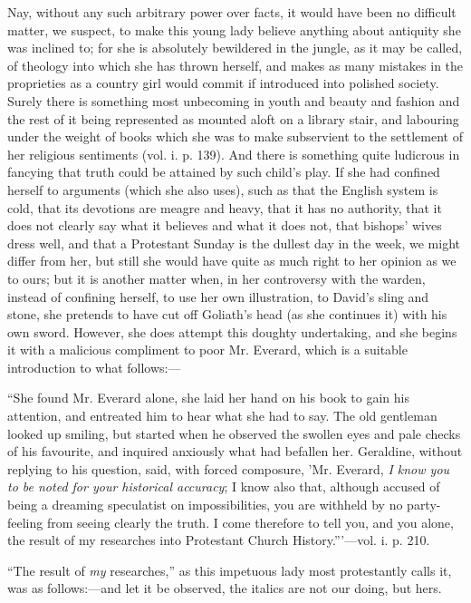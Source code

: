Nay, without any such arbitrary power over facts,
it would have been no difficult matter, we suspect, to make this young
lady believe anything about antiquity she was inclined to; for she is
absolutely bewildered in the jungle, as it may be called, of theology
into which she has thrown herself, and makes as many mistakes in the
proprieties as a country girl would commit if introduced into polished
society. Surely there is something most unbecoming in youth and beauty
and fashion and the rest of it being represented as mounted aloft on a
library stair, and labouring under the weight of books which she was to
make subservient to the settlement of her religious sentiments (vol. i.
p. 139). And there is something quite ludicrous in fancying that truth
could be attained by such child's play. If she had confined herself to
arguments (which she also uses), such as that the English system is
cold, that its devotions are meagre and heavy, that it has no authority,
that it does not clearly say what it believes and what it does not, that
bishops' wives dress well, and that a Protestant Sunday is the dullest
day in the week, we might differ from her, but still she would have
quite as much right to her opinion as we to ours; but it is another
matter when, in her controversy with the warden, instead of confining
herself, to use her own illustration, to David's sling and stone, she
pretends to have cut off Goliath's head (as she continues it) with his
own sword. However, she does attempt this doughty undertaking, and she
begins it with a malicious compliment to poor Mr. Everard, which is a
suitable introduction to what follows:—

``She found Mr. Everard alone, she
laid her hand on his book to gain his
attention, and entreated him to hear what she had to say. The old
gentleman looked up smiling, but started when he observed the swollen
eyes and pale checks of his favourite, and inquired anxiously what had
befallen her. Geraldine, without replying to his question, said, with
forced composure, 'Mr. Everard, \emph{I know you to be noted for your
historical accuracy}; I know also that, although accused of being a
dreaming speculatist on impossibilities, you are withheld by no
party-feeling from seeing clearly the truth. I come therefore to tell
you, and you alone, the result of my researches into Protestant Church
History.'''—vol. i. p. 210.

``The result of \emph{my} researches,'' as this
impetuous lady most protestantly calls it, was as follows:—and let it
be observed, the italics are not our doing, but hers.

